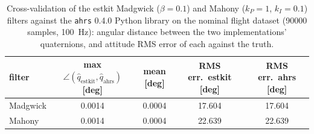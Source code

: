 \begin{table}[H]\centering\footnotesize\setlength{\tabcolsep}{4pt}\caption{Cross-validation of the estkit Madgwick ($\beta=0.1$) and Mahony ($k_P=1$, $k_I=0.1$) filters against the \texttt{ahrs} 0.4.0 Python library on the nominal flight dataset (90000 samples, \SI{100}{\hertz}): angular distance between the two implementations' quaternions, and attitude RMS error of each against the truth.}\label{tab:val_ahrs}
\begin{tabular}{lcccc}\toprule filter & max $\angle(\hat q_{\mathrm{estkit}}, \hat q_{\mathrm{ahrs}})$ [deg] & mean [deg] & RMS err.\ estkit [deg] & RMS err.\ ahrs [deg] \\ \midrule
Madgwick & 0.0014 & 0.0004 & 17.604 & 17.604 \\
Mahony & 0.0014 & 0.0004 & 22.639 & 22.639 \\
\bottomrule\end{tabular}\end{table}
